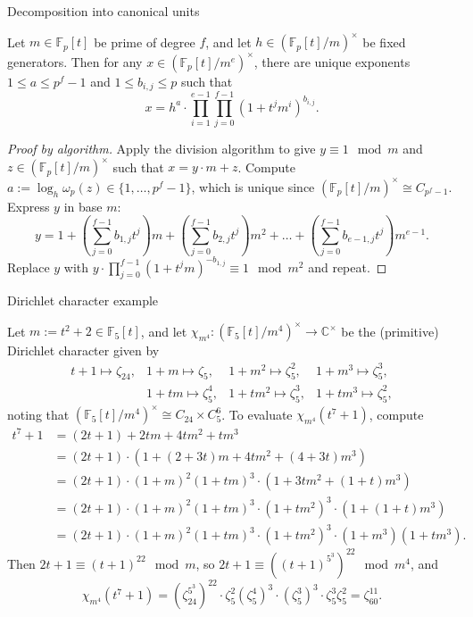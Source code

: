 \documentclass[10pt]{beamer}
\begin{document}
\begin{frame}[t]{Decomposition into canonical units}

\begin{lemma}
Let $ m \in \mathbb{F}_p[t] $ be prime of degree $ f $, and let $ h \in (\mathbb{F}_p[t] / m)^\times $ be fixed generators. Then for any $ x \in (\mathbb{F}_p[t] / m^e)^\times $, there are unique exponents $ 1 \le a \le p^f - 1 $ and $ 1 \le b_{i, j} \le p $ such that
$$ x = h^a \cdot \prod_{i = 1}^{e - 1} \prod_{j = 0}^{f - 1} (1 + t^jm^i)^{b_{i, j}}. $$
\end{lemma}

\vspace{-0.5cm}

\begin{proof}[Proof by algorithm]
Apply the division algorithm to give $ y \equiv 1 \mod m $ and $ z \in (\mathbb{F}_p[t] / m)^\times $ such that $ x = y \cdot m + z $. Compute $ a := \log_h\omega_p(z) \in \{1, \dots, p^f - 1\} $, which is unique since $ (\mathbb{F}_p[t] / m)^\times \cong C_{p^f - 1} $. Express $ y $ in base $ m $:
$$ \textstyle y = 1 + (\sum_{j = 0}^{f - 1} b_{1, j}t^j)m + (\sum_{j = 0}^{f - 1} b_{2, j}t^j)m^2 + \dots + (\sum_{j = 0}^{f - 1} b_{e - 1, j}t^j)m^{e - 1}. $$
Replace $ y $ with $ y \cdot \prod_{j = 0}^{f - 1} (1 + t^jm)^{-b_{1, j}} \equiv 1 \mod m^2 $ and repeat.
\end{proof}

\end{frame}

\begin{frame}[t]{Dirichlet character example}

Let $ m := t^2 + 2 \in \mathbb{F}_5[t] $, and let $ \chi_{m^4} : (\mathbb{F}_5[t] / m^4)^\times \to \mathbb{C}^\times $ be the (primitive) Dirichlet character given by
$$
\begin{array}{cccc}
t + 1 \mapsto \zeta_{24}, & 1 + m \mapsto \zeta_5, & 1 + m^2 \mapsto \zeta_5^2, & 1 + m^3 \mapsto \zeta_5^3, \\
& 1 + tm \mapsto \zeta_5^4, & 1 + tm^2 \mapsto \zeta_5^3, & 1 + tm^3 \mapsto \zeta_5^2,
\end{array}
$$
noting that $ (\mathbb{F}_5[t] / m^4)^\times \cong C_{24} \times C_5^6 $. To evaluate $ \chi_{m^4}(t^7 + 1) $, compute
\begin{align*}
t^7 + 1
& = (2t + 1) + 2tm + 4tm^2 + tm^3 \\
& = (2t + 1) \cdot (1 + (2 + 3t)m + 4tm^2 + (4 + 3t)m^3) \\
& = (2t + 1) \cdot (1 + m)^2(1 + tm)^3 \cdot (1 + 3tm^2 + (1 + t)m^3) \\
& = (2t + 1) \cdot (1 + m)^2(1 + tm)^3 \cdot (1 + tm^2)^3 \cdot (1 + (1 + t)m^3) \\
& = (2t + 1) \cdot (1 + m)^2(1 + tm)^3 \cdot (1 + tm^2)^3 \cdot (1 + m^3)(1 + tm^3).
\end{align*}
Then $ 2t + 1 \equiv (t + 1)^{22} \mod m $, so $ 2t + 1 \equiv ((t + 1)^{5^3})^{22} \mod m^4 $, and
$$ \chi_{m^4}(t^7 + 1) = (\zeta_{24}^{5^3})^{22} \cdot \zeta_5^2(\zeta_5^4)^3 \cdot (\zeta_5^3)^3 \cdot \zeta_5^3\zeta_5^2 = \zeta_{60}^{11}. $$

\end{frame}
\end{document}
